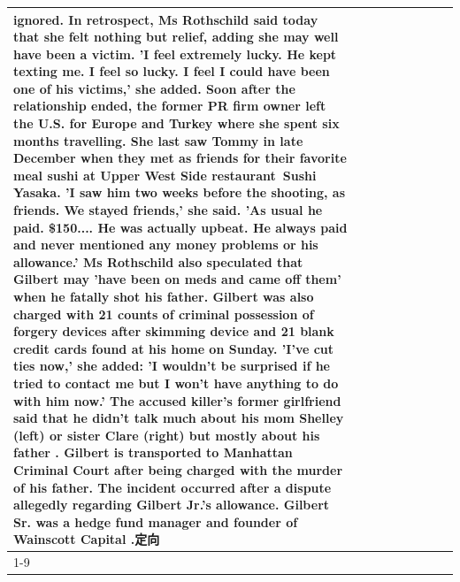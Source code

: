 \begin{table}[H]
\begin{tabular}{lllrlllll}
ignored. In retrospect, Ms Rothschild said today that she felt nothing but relief, adding she may well have been a victim. 'I feel extremely lucky. He kept texting me. I feel so lucky. I feel I could have been one of his victims,' she added. Soon after the relationship ended, the former PR firm owner left the U.S. for Europe and Turkey where she spent six months  travelling. She last saw Tommy in late December when they met as friends for their favorite meal sushi at Upper West Side restaurant Sushi Yasaka. 'I saw him two weeks before the shooting, as friends. We stayed friends,' she said. 'As usual he paid. \$150.... He was actually upbeat. He always paid and never mentioned any money problems or his allowance.' Ms Rothschild also speculated that Gilbert may 'have been on meds and came off them' when he fatally shot his father. Gilbert was also charged with 21 counts of criminal possession of forgery devices after skimming device and 21 blank credit cards found at his home on Sunday. 'I've cut ties now,' she added: 'I wouldn’t be surprised if he tried to contact me but I won’t have anything to do with him now.' The accused killer's former girlfriend said that he didn't talk much about his mom Shelley (left) or sister Clare (right) but mostly about his father . Gilbert is transported to Manhattan Criminal Court  after being charged with the murder of his father. The incident occurred after a dispute allegedly regarding Gilbert Jr.'s allowance. Gilbert Sr. was a hedge fund manager and founder of Wainscott Capital .定向 \\
\cline{1-9}

\end{tabular}
\end{table}
